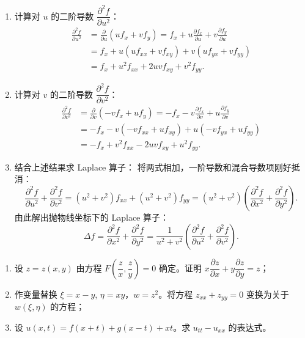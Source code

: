 \documentclass[lang=cn,11pt]{elegantbook}
\begin{document}
\begin{solution}
\begin{enumerate}
\begin{enumerate}
      \item 计算对 $u$ 的二阶导数 $\dfrac{\partial^2 f}{\partial u^2}$：
      \begin{align*}
      \frac{\partial^2 f}{\partial u^2} &= \frac{\partial}{\partial u}\left(u f_x + v f_y\right) = f_x + u \frac{\partial f_x}{\partial u} + v \frac{\partial f_y}{\partial u} \\[6pt]
      &= f_x + u(u f_{xx} + v f_{xy}) + v(u f_{yx} + v f_{yy}) \\[6pt]
      &= f_x + u^2 f_{xx} + 2uv f_{xy} + v^2 f_{yy}.
      \end{align*}
      
      \item 计算对 $v$ 的二阶导数 $\dfrac{\partial^2 f}{\partial v^2}$：
      \begin{align*}
      \frac{\partial^2 f}{\partial v^2} &= \frac{\partial}{\partial v}\left(-v f_x + u f_y\right) = -f_x - v \frac{\partial f_x}{\partial v} + u \frac{\partial f_y}{\partial v} \\[6pt]
      &= -f_x - v(-v f_{xx} + u f_{xy}) + u(-v f_{yx} + u f_{yy}) \\[6pt]
      &= -f_x + v^2 f_{xx} - 2uv f_{xy} + u^2 f_{yy}.
      \end{align*}
      
      \item 结合上述结果求 Laplace 算子：
      将两式相加，一阶导数和混合导数项刚好抵消：
      \[
      \frac{\partial^2 f}{\partial u^2} + \frac{\partial^2 f}{\partial v^2} = (u^2+v^2)f_{xx} + (u^2+v^2)f_{yy} = (u^2+v^2)\left(\frac{\partial^2 f}{\partial x^2} + \frac{\partial^2 f}{\partial y^2}\right).
      \]
      由此解出抛物线坐标下的 Laplace 算子：
      \[
      \Delta f = \frac{\partial^2 f}{\partial x^2} + \frac{\partial^2 f}{\partial y^2} = \frac{1}{u^2+v^2}\left(\frac{\partial^2 f}{\partial u^2} + \frac{\partial^2 f}{\partial v^2}\right).
      \]
  \end{enumerate}
\end{enumerate}
\end{solution}

\begin{exercise}
\begin{enumerate}
  \item[(1)] 设 $z=z(x,y)$ 由方程 $F\!\left(\dfrac{z}{x},\dfrac{z}{y}\right)=0$ 确定。证明 $x\dfrac{\partial z}{\partial x}+y\dfrac{\partial z}{\partial y}=z$；
  \item[(2)] 作变量替换 $\xi=x-y$, $\eta=xy$，$w=z^2$。将方程 $z_{xx}+z_{yy}=0$ 变换为关于 $w(\xi,\eta)$ 的方程；
  \item[(3)] 设 $u(x,t)=f(x+t)+g(x-t)+xt$。求 $u_{tt}-u_{xx}$ 的表达式。
\end{enumerate}
\end{exercise}
\end{document}

